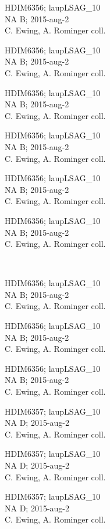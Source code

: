 \documentclass[2pt]{extarticle}
\begin{document}
\noindent
\parbox{0.16\textwidth}{\tiny \raggedright \rule[-0.3\baselineskip]{0pt}{10pt}HDIM6356; laupLSAG\_10\\ NA B; 2015-aug-2\\ C. Ewing, A. Rominger coll.}
\parbox{0.16\textwidth}{\tiny \raggedright \rule[-0.3\baselineskip]{0pt}{10pt}HDIM6356; laupLSAG\_10\\ NA B; 2015-aug-2\\ C. Ewing, A. Rominger coll.}
\parbox{0.16\textwidth}{\tiny \raggedright \rule[-0.3\baselineskip]{0pt}{10pt}HDIM6356; laupLSAG\_10\\ NA B; 2015-aug-2\\ C. Ewing, A. Rominger coll.}
\parbox{0.16\textwidth}{\tiny \raggedright \rule[-0.3\baselineskip]{0pt}{10pt}HDIM6356; laupLSAG\_10\\ NA B; 2015-aug-2\\ C. Ewing, A. Rominger coll.}
\parbox{0.16\textwidth}{\tiny \raggedright \rule[-0.3\baselineskip]{0pt}{10pt}HDIM6356; laupLSAG\_10\\ NA B; 2015-aug-2\\ C. Ewing, A. Rominger coll.}
\parbox{0.16\textwidth}{\tiny \raggedright \rule[-0.3\baselineskip]{0pt}{10pt}HDIM6356; laupLSAG\_10\\ NA B; 2015-aug-2\\ C. Ewing, A. Rominger coll.} \\ 
\vspace{0.001in} 

\noindent
\parbox{0.16\textwidth}{\tiny \raggedright \rule[-0.3\baselineskip]{0pt}{10pt}HDIM6356; laupLSAG\_10\\ NA B; 2015-aug-2\\ C. Ewing, A. Rominger coll.}
\parbox{0.16\textwidth}{\tiny \raggedright \rule[-0.3\baselineskip]{0pt}{10pt}HDIM6356; laupLSAG\_10\\ NA B; 2015-aug-2\\ C. Ewing, A. Rominger coll.}
\parbox{0.16\textwidth}{\tiny \raggedright \rule[-0.3\baselineskip]{0pt}{10pt}HDIM6356; laupLSAG\_10\\ NA B; 2015-aug-2\\ C. Ewing, A. Rominger coll.}
\parbox{0.16\textwidth}{\tiny \raggedright \rule[-0.3\baselineskip]{0pt}{10pt}HDIM6357; laupLSAG\_10\\ NA D; 2015-aug-2\\ C. Ewing, A. Rominger coll.}
\parbox{0.16\textwidth}{\tiny \raggedright \rule[-0.3\baselineskip]{0pt}{10pt}HDIM6357; laupLSAG\_10\\ NA D; 2015-aug-2\\ C. Ewing, A. Rominger coll.}
\parbox{0.16\textwidth}{\tiny \raggedright \rule[-0.3\baselineskip]{0pt}{10pt}HDIM6357; laupLSAG\_10\\ NA D; 2015-aug-2\\ C. Ewing, A. Rominger coll.} \\ 
\vspace{0.001in} 
\end{document}
